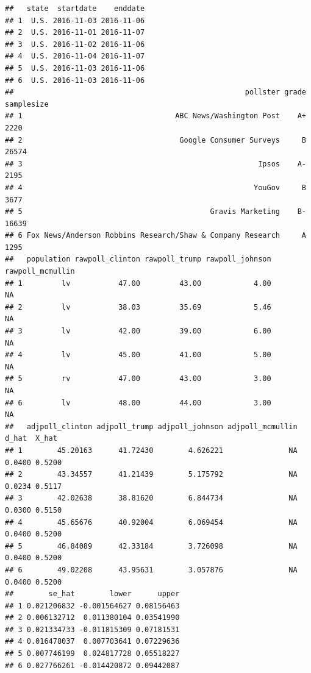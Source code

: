 \documentclass[
]{article}
\begin{document}
\begin{verbatim}
##   state  startdate    enddate
## 1  U.S. 2016-11-03 2016-11-06
## 2  U.S. 2016-11-01 2016-11-07
## 3  U.S. 2016-11-02 2016-11-06
## 4  U.S. 2016-11-04 2016-11-07
## 5  U.S. 2016-11-03 2016-11-06
## 6  U.S. 2016-11-03 2016-11-06
##                                                     pollster grade samplesize
## 1                                   ABC News/Washington Post    A+       2220
## 2                                    Google Consumer Surveys     B      26574
## 3                                                      Ipsos    A-       2195
## 4                                                     YouGov     B       3677
## 5                                           Gravis Marketing    B-      16639
## 6 Fox News/Anderson Robbins Research/Shaw & Company Research     A       1295
##   population rawpoll_clinton rawpoll_trump rawpoll_johnson rawpoll_mcmullin
## 1         lv           47.00         43.00            4.00               NA
## 2         lv           38.03         35.69            5.46               NA
## 3         lv           42.00         39.00            6.00               NA
## 4         lv           45.00         41.00            5.00               NA
## 5         rv           47.00         43.00            3.00               NA
## 6         lv           48.00         44.00            3.00               NA
##   adjpoll_clinton adjpoll_trump adjpoll_johnson adjpoll_mcmullin  d_hat  X_hat
## 1        45.20163      41.72430        4.626221               NA 0.0400 0.5200
## 2        43.34557      41.21439        5.175792               NA 0.0234 0.5117
## 3        42.02638      38.81620        6.844734               NA 0.0300 0.5150
## 4        45.65676      40.92004        6.069454               NA 0.0400 0.5200
## 5        46.84089      42.33184        3.726098               NA 0.0400 0.5200
## 6        49.02208      43.95631        3.057876               NA 0.0400 0.5200
##        se_hat        lower      upper
## 1 0.021206832 -0.001564627 0.08156463
## 2 0.006132712  0.011380104 0.03541990
## 3 0.021334733 -0.011815309 0.07181531
## 4 0.016478037  0.007703641 0.07229636
## 5 0.007746199  0.024817728 0.05518227
## 6 0.027766261 -0.014420872 0.09442087
\end{verbatim}
\end{document}
